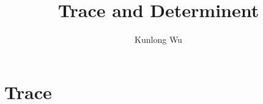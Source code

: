\documentclass{aq-notes}
\title{Trace and Determinent}
\author{Kunlong Wu}
\begin{document}
    \section{Trace}
    
\end{document}
